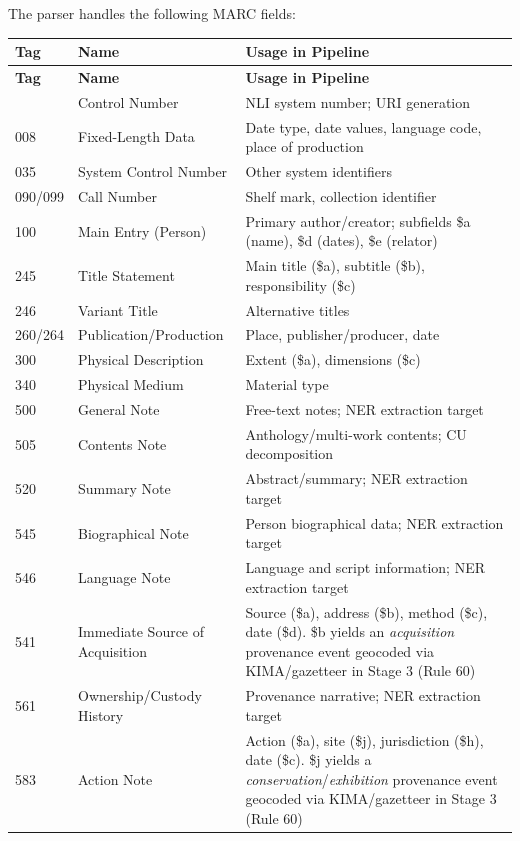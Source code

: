 \documentclass[12pt]{article}
\begin{document}
The parser handles the following MARC fields:

\begin{longtable}{|l|l|p{8cm}|}
\hline
\textbf{Tag} & \textbf{Name} & \textbf{Usage in Pipeline} \\
\hline
\endfirsthead
\hline
\textbf{Tag} & \textbf{Name} & \textbf{Usage in Pipeline} \\
\hline
\endhead
\hline
\endfoot
001 & Control Number & NLI system number; URI generation \\
\hline
008 & Fixed-Length Data & Date type, date values, language code, place of production \\
\hline
035 & System Control Number & Other system identifiers \\
\hline
090/099 & Call Number & Shelf mark, collection identifier \\
\hline
100 & Main Entry (Person) & Primary author/creator; subfields \$a (name), \$d (dates), \$e (relator) \\
\hline
245 & Title Statement & Main title (\$a), subtitle (\$b), responsibility (\$c) \\
\hline
246 & Variant Title & Alternative titles \\
\hline
260/264 & Publication/Production & Place, publisher/producer, date \\
\hline
300 & Physical Description & Extent (\$a), dimensions (\$c) \\
\hline
340 & Physical Medium & Material type \\
\hline
500 & General Note & Free-text notes; NER extraction target \\
\hline
505 & Contents Note & Anthology/multi-work contents; CU decomposition \\
\hline
520 & Summary Note & Abstract/summary; NER extraction target \\
\hline
545 & Biographical Note & Person biographical data; NER extraction target \\
\hline
546 & Language Note & Language and script information; NER extraction target \\
\hline
541 & Immediate Source of Acquisition & Source (\$a), address (\$b), method (\$c), date (\$d). \$b yields an \emph{acquisition} provenance event geocoded via KIMA/gazetteer in Stage 3 (Rule 60) \\
\hline
561 & Ownership/Custody History & Provenance narrative; NER extraction target \\
\hline
583 & Action Note & Action (\$a), site (\$j), jurisdiction (\$h), date (\$c). \$j yields a \emph{conservation}/\emph{exhibition} provenance event geocoded via KIMA/gazetteer in Stage 3 (Rule 60) \\

\end{longtable}
\end{document}
